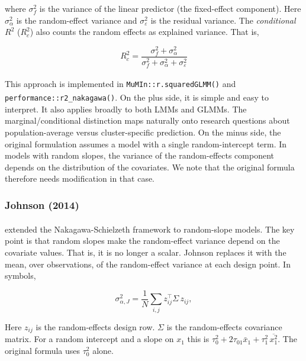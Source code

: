 \documentclass[
  11pt,
]{article}
\begin{document}
where \(\sigma^2_f\) is the variance of the linear predictor (the
fixed-effect component). Here \(\sigma^2_\alpha\) is the
random-effect variance and \(\sigma^2_\varepsilon\) is the residual
variance.
The \emph{conditional} \(R^2\) (\(R^2_c\)) also counts the random effects
as explained variance. That is,

\begin{equation}
R^2_c = \frac{\sigma^2_f + \sigma^2_\alpha}{\sigma^2_f +
  \sigma^2_\alpha + \sigma^2_\varepsilon}
\label{eq:ns-r2c}
\end{equation}

This approach is implemented in \texttt{MuMIn::r.squaredGLMM()}\textsuperscript{} and \texttt{performance::r2\_nakagawa()}\textsuperscript{}. On the plus side, it is
simple and easy to interpret. It also applies broadly to both
LMMs and GLMMs. The marginal/conditional distinction maps
naturally onto research questions about population-average versus
cluster-specific prediction. On the minus side, the original
formulation assumes a model with a single random-intercept term.
In models with random slopes, the variance of the random-effects
component depends on the distribution of the covariates. We note
that the original formula therefore needs modification in that
case.

\subsubsection{Johnson (2014)}\label{johnson-2014}

\textsuperscript{} extended the
Nakagawa-Schielzeth framework to random-slope models. The key
point is that random slopes make the random-effect variance
depend on the covariate values. That is, it is no longer a
scalar. Johnson replaces it with the mean, over observations, of
the random-effect variance at each design point. In symbols,

\begin{equation}
\sigma^2_{\alpha,J} = \frac{1}{N} \sum_{i,j}
  z_{ij}^\top \Sigma \, z_{ij},
\label{eq:johnson}
\end{equation}

Here \(z_{ij}\) is the random-effects design row. \(\Sigma\) is the
random-effects covariance matrix. For a random intercept and
a slope on \(x_1\) this is
\(\tau_0^2 + 2\tau_{01}\bar{x}_1 + \tau_1^2\,\overline{x_1^2}\).
The original formula uses \(\tau_0^2\) alone.
\end{document}

